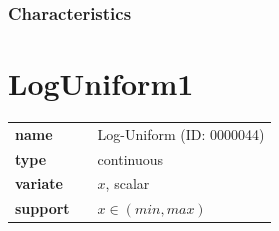 \subsubsection*{Characteristics}
\smallskip
%
%
% 
%
%
%
%
%
\section*{LogUniform1} 

  \bigskip 

\begin{tabular}{p{2cm}cl}
\textbf{name} & & Log-Uniform (ID: 0000044)\\ 
 
\textbf{type} & & continuous \\ 

\textbf{variate} & & $x$, scalar \\ 

\textbf{support} & & $x \in (min,max)$
\end{tabular}

